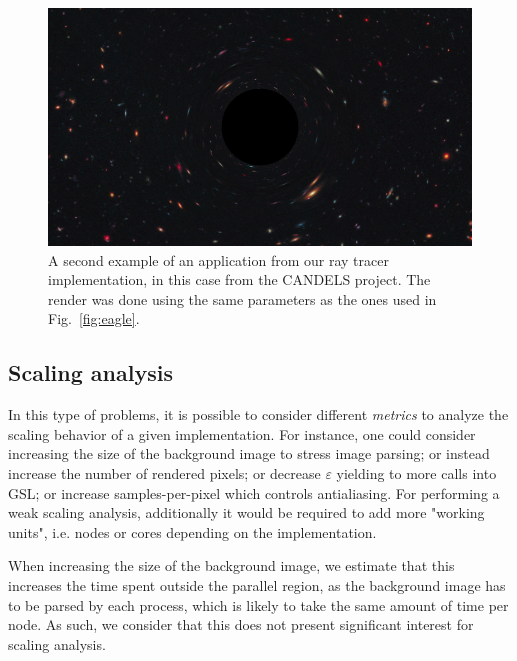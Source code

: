 \begin{figure}[h]
  \centering
  \includegraphics[width=0.8\linewidth]{figs/starry_render}
  \caption{A second example of an application from our ray tracer implementation,
	in this case from the CANDELS project\cite{candels-nasa_svs}.
	The render was done using the same parameters as the ones used in Fig.~\ref{fig:eagle}.
	}
  \label{fig:starry}
\end{figure}




\subsection{Scaling analysis}


In this type of problems, it is possible to consider different \textit{metrics} to analyze the scaling behavior of a given implementation.
For instance, one could consider increasing the size of the background image to stress image parsing;
or instead increase the number of rendered pixels;
or decrease $\varepsilon$ yielding to more calls into GSL;
or increase samples-per-pixel which controls antialiasing.
For performing a weak scaling analysis, additionally it would be required to add more "working units", i.e. nodes or cores depending on the implementation.

When increasing the size of the background image, we estimate that this increases the time spent outside the parallel region, as the background image has to be parsed by each process, which is likely to take the same amount of time per node.
As such, we consider that this does not present significant interest for scaling analysis.

